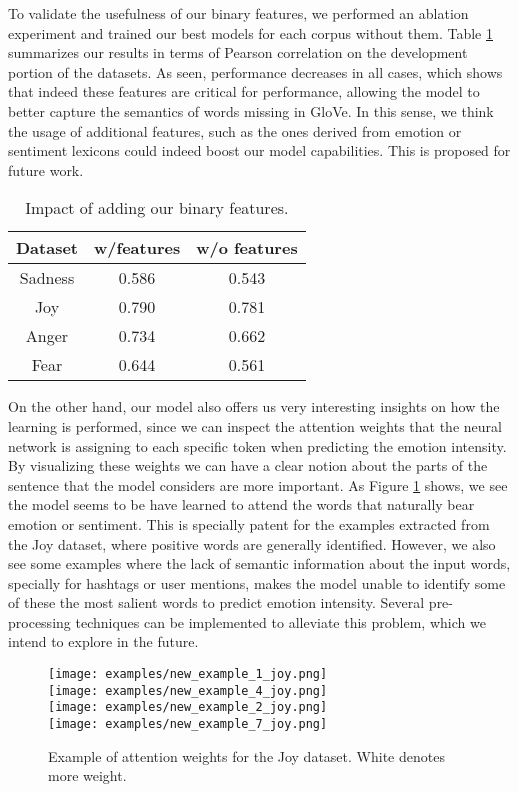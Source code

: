 \documentclass[11pt,letterpaper]{article}
\begin{document}
To validate the usefulness of our binary features, we performed an ablation experiment and trained our best models for each corpus without them. Table \ref{table:ablation_study} summarizes our results in terms of Pearson correlation on the development portion of the datasets. As seen, performance decreases in all cases, which shows that indeed these features are critical for performance, allowing the model to better capture the semantics of words missing in GloVe. In this sense, we think the usage of additional features, such as the ones derived from emotion or sentiment lexicons could indeed boost our model capabilities. This is proposed for future work.

\begin{table}[h!]
	\centering
	\begin{tabular}{c | c | c }
		
		\textbf{Dataset} & \textbf{w/features} & \textbf{w/o features} \\
		\hline
		Sadness	& 0.586 & 0.543	\\
		Joy 	& 0.790	& 0.781	\\	
		Anger	& 0.734	& 0.662	\\
		Fear	& 0.644	& 0.561	\\
		\hline
	\end{tabular}
	\caption{Impact of adding our binary features.}
	\label{table:ablation_study}
\end{table}


On the other hand, our model also offers us very interesting insights on how the learning is performed, since we can inspect the attention weights that the neural network is assigning to each specific token when predicting the emotion intensity. By visualizing these weights we can have a clear notion about the parts of the sentence that the model considers are more important. As Figure \ref{fig:attention} shows, we see the model seems to be have learned to attend the words that naturally bear emotion or sentiment. This is specially patent for the examples extracted from the Joy dataset, where positive words are generally identified. However, we also see some examples where the lack of semantic information about the input words, specially for hashtags or user mentions, makes the model unable to identify some of these the most salient words to predict emotion intensity. Several pre-processing techniques can be implemented to alleviate this problem, which we intend to explore in the future.


\begin{figure}[h!]
	\centering
	\texttt{[image: examples/new\_example\_1\_joy.png]}
	\\
	\texttt{[image: examples/new\_example\_4\_joy.png]}
	\\
	\texttt{[image: examples/new\_example\_2\_joy.png]}
	\\	\texttt{[image: examples/new\_example\_7\_joy.png]}
	\caption{Example of attention weights for the Joy dataset. White denotes more weight.}
	\label{fig:attention}
\end{figure}
\end{document}
